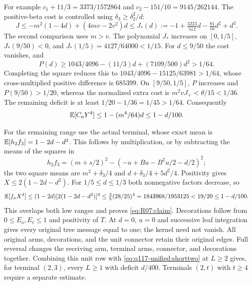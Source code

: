 For example $c_1+11/3=3373/1572864$ and
$c_2-151/10=9145/262144$.
The positive-beta cost is controlled using $\delta_3\ge\delta_2^2/d$:
\[
 J\le-m^2(1-4d)+(4mv-2v^2)d
 \le J_*(d):=-1+\tfrac{3223}{512}d-\tfrac{81}{16}d^2+d^3.
\]
The second comparison uses $m>v$. The polynomial $J_*$ increases on
$[0,1/5]$, $J_*(9/50)<0$, and $J_*(1/5)=4127/64000<1/15$.
For $d\le9/50$ the cost vanishes, and
\[
 P(d)\ge1043/4096-(11/3)d+(7109/500)d^2>1/64.
\]
Completing the square reduces this to
$1043/4096-15125/63981>1/64$, whose cross-multiplied positive
difference is $685399$. On $[9/50,1/5]$, $P$ increases and
$P(9/50)>1/20$, whereas the normalized extra cost is
$m^2vJ_+<\theta/15<1/36$. The remaining deficit is at least
$1/20-1/36=1/45>1/64$. Consequently
\[
 \mathbb E[C_aY^4]\le1-(m^4/64)d\le1-d/100.
\]

For the remaining range use the actual terminal, whose exact mean is
$\mathbb E[h_2f_3]=1-2d-d^2$. This follows by multiplication, or by subtracting
the means of the squares in
\[
h_2f_3=(m+s/2)^2-(-u+Bu-B^2u/2-d/2)^2;
\]
the two square means are $m^2+\delta_3/4$ and
$d+\delta_3/4+5d^2/4$. Positivity gives $X\le2(1-2d-d^2)$.
For $1/5\le d\le1/3$ both nonnegative factors decrease, so
\[
 \mathbb E[f_aX^4]\le(1-2d)[2(1-2d-d^2)]^4
 \le\tfrac35(28/25)^4=1843968/1953125<19/20\le1-d/100.
\]
This overlaps both low ranges and proves \eqref{eq:R07:claim}.
Decorations follow from $0\le E_o,E_t\le1$ and positivity of $T$.
At $d=0$, $u=0$ and successive leaf integration gives every original
tree message equal to one; the kernel need not vanish. All original
arms, decorations, and the unit connector retain their original edges.
Full reversal changes the receiving arm, terminal arms, connector, and
decorations together. Combining this unit row with \eqref{eq:q117-unified:shorttwo}
at $L\ge2$ gives, for terminal $(2,3)$, every $L\ge1$ with deficit
$d/400$. Terminals $(2,t)$ with $t\ge4$ require a separate estimate.
